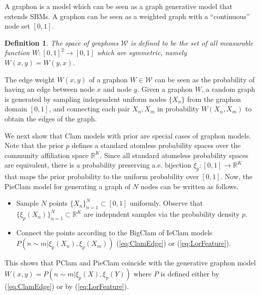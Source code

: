 \documentclass[letterpaper]{article} %
\newtheorem{definition}[theorem]{Definition}
\begin{document}
A graphon is a model which can be seen as a graph generative model that extends SBMs.
A graphon \cite{graphon1,cut-homo3} can be seen as a weighted graph with a ``continuous'' node set $[0,1]$. %
%




\begin{definition}
    The space of graphons $\mathcal{W}$ is defined to be the set of all measurable function  $W:[0,1]^2\rightarrow [0,1]$ which are symmetric, namely $W(x,y)=W(y,x)$. 
\end{definition}
%
%
The edge weight $W(x,y)$ of a graphon $W\in \mathcal{W}$ can be seen as the probability of having an edge between node $x$ and node $y$.   Given a graphon $W$, a random graph is generated by sampling  independent uniform nodes $\{X_n\}$ from the graphon domain $[0,1]$, and connecting each pair $X_n,X_m$ in probability $W(X_n,X_m)$ to obtain the edges of the graph.

We next show that Clam models with prior are special cases of graphon models. 
Note that the prior $p$ defines a standard atomless probability spaces over the community affiliation space $\mathbb{R}^K$. Since all standard atomeless probability spaces are equivalent, there is a probability preserving a.e. bijection  $\xi_p:[0,1]\rightarrow\mathbb{R}^K$ that maps the prior probability to the uniform probability over $[0,1]$. Now, the PieClam model for generating a graph of $N$ nodes can be written as follows.
\begin{itemize}
    \item 
    Sample $N$ points $\{X_n\}_{n=1}^N\subset[0,1]$ uniformly. Observe that $\{\xi_p(X_n)\}_{n=1}^N\subset \mathbb{R}^K$ are indepndent samples via the probability density $p$.
    \item 
    Connect the points according to the BigClam of IeClam models $P(n\sim m| \xi_p(X_n),\xi_p(X_m))$ (\ref{eq:ClamEdge}) or (\ref{eq:LorFeature}).
\end{itemize}
This shows that PClam and PieClam coincide with the generative graphon model $W(x,y)=P(n\sim m| \xi_p(X),\xi_p(Y))$ where $P$ is defined either by  (\ref{eq:ClamEdge}) or by (\ref{eq:LorFeature}).
\end{document}
